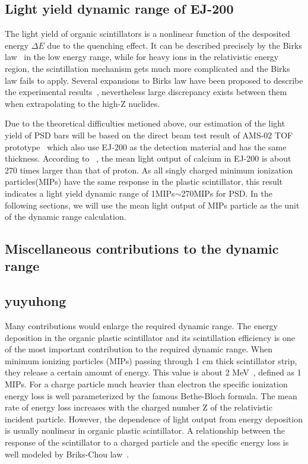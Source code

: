 \documentclass[5p, times]{elsarticle}
\begin{document}
\subsection{Light yield dynamic range of EJ-200}
The light yield of organic scintillators is a nonlinear function of the desposited energy $\Delta E$ due to the quenching effect.
It can be described precisely by the Birks law~\cite{birks_theory_2013} in the low energy range, while for heavy ions in the relativistic energy region, the scintillation mechanism gets much more complicated and the Birks law fails to apply.
Several expansions to Birks law have been proposed to describe the experimental results~\cite{chou_nature_1952,tarle_cosmic_1979,menchaca-rocha_response_1999,matsufuji_response_1999}, nevertheless large discrepancy exists between them when extrapolating to the high-Z nuclides.

Due to the theoretical difficulties metioned above, our estimation of the light yield of PSD bars will be based on the direct beam test result of AMS-02 TOF prototype~\cite{marrocchesi2011beam} which also use EJ-200 as the detection material and has the same thickness.
According to ~\cite{marrocchesi2011beam}, the mean light output of calcium in EJ-200 is about 270 times larger than that of proton.
As all singly charged minimum ionization particles(MIPs) have the same response in the plastic scintillator, this result indicates a light yield dynamic range of 1\si{MIPs}$\sim$270\si{MIPs} for PSD.
In the following sections, we will use the mean light output of MIPs particle as the unit of the dynamic range calculation. 

\subsection{Miscellaneous contributions to the dynamic range}

\subsection{yuyuhong}
Many contributions would enlarge the required dynamic range. 
The energy deposition in the organic plastic scintillator and its scintillation efficiency is one of the most important contribution to the required dynamic range. 
When minimum ionizing particles (MIPs) passing through 1 cm thick scintillator strip, they release a certain amount of energy. 
This value is about 2 MeV~\cite{olive_review_2014}, defined as 1 MIPs. 
For a charge particle much heavier than electron the specific ionization energy loss is well parameterized by the famous Bethe-Bloch formula. 
The mean rate of energy loss increases with the charged number Z of the relativistic incident particle. 
However, the dependence of light output from energy deposition is usually nonlinear in organic plastic scintillator. 
A relationship between the response of the scintillator to a charged particle and the specific energy loss is well modeled by Briks-Chou law~\cite{birks1951scintillations,birks1964theory}. 
\end{document}
